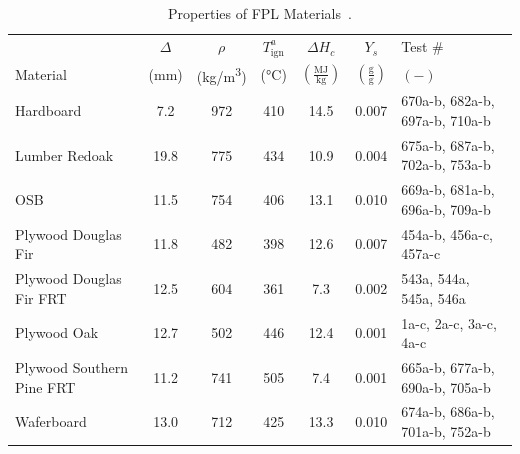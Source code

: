 \begin{table}[!h]
\caption[Properties of FPL Materials]{Properties of FPL Materials~\cite{FPL:Fire_Database}.}
\centering
\begin{tabular}{|p{4.5cm}|c|c|c|c|c|l|}
\hline
            & $\Delta$& $\rho$& $T_{\mathrm{ign}}^{a}$&$\Delta H_{c}$&$Y_{s}$ & Test \# \\
Material    & (mm) & (\unit{kg/m^3}) & (\unit{\degreeCelsius})   & $\left(\mathrm{\frac{MJ}{kg}}\right)$ & $\mathrm{\left(\frac{g}{g}\right)}$ & $\mathrm{( - )}$  \\ \hline
\hline
Hardboard                                         & 7.2  & 972 & 410 & 14.5 & 0.007 & 670a-b, 682a-b, 697a-b, 710a-b \\\hline
Lumber Redoak                                     & 19.8 & 775 & 434 & 10.9 & 0.004 & 675a-b, 687a-b, 702a-b, 753a-b \\\hline
OSB                                               & 11.5 & 754 & 406 & 13.1 & 0.010 & 669a-b, 681a-b, 696a-b, 709a-b \\\hline
Plywood Douglas Fir                               & 11.8 & 482 & 398 & 12.6 & 0.007 & 454a-b, 456a-c, 457a-c \\\hline
Plywood Douglas Fir FRT                           & 12.5 & 604 & 361 & 7.3  & 0.002 & 543a, 544a, 545a, 546a \\\hline
Plywood Oak                                       & 12.7 & 502 & 446 & 12.4 & 0.001 & 1a-c, 2a-c, 3a-c, 4a-c \\\hline
Plywood Southern Pine FRT                         & 11.2 & 741 & 505 & 7.4  & 0.001 & 665a-b, 677a-b, 690a-b, 705a-b \\\hline
Waferboard                                        & 13.0 & 712 & 425 & 13.3 & 0.010 & 674a-b, 686a-b, 701a-b, 752a-b \\\hline
\end{tabular}
\label{Properties_FPL_Materials_All}
\end{table}
\vspace{-0.4cm}
\\


